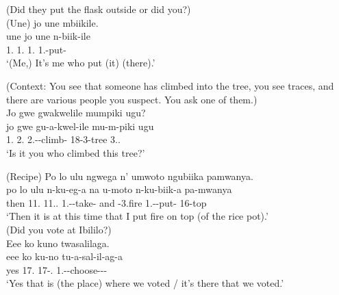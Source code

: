 \documentclass[output=paper]{langscibook}
\begin{document}
\ea
\label{bkm:Ref98085850}
(Did they put the flask outside or did you?)\\
(Une) jo une mbiikile.\\
\gll
une  jo  une  n-biik-ile\\
1\SG.\PRO{}  1.\IDCOP{}  1\SG.\PRO{}  1\SG.\SM{}-put-\PFV{}\\
\glt
‘(Me,) It’s me who put (it) (there).’\\

\z


\ea
(Context: You see that someone has climbed into the tree, you see traces, and there are various people you suspect. You ask one of them.)\\
Jo gwe gwakwelile mumpiki ugu?\\
\gll
jo  gwe  gu-a-kwel-ile  mu-m-piki  ugu\\
1.\IDCOP{}  2\SG.\PRO{}  2\SG.\SM-\PST{}-climb-\PFV{}  18-3-tree  3.\DEM.\PROX{}\\
\glt
‘Is it you who climbed this tree?’\\

\z


\ea
\label{bkm:Ref98085919}
(Recipe)
Po lo ulu ngwega n’ umwoto ngubiika pamwanya.\\
\gll
po  lo  ulu  n-ku-eg-a  na  u-moto   n-ku-biik-a  pa-mwanya \\
then  11.\IDCOP{}  11.\DEM.\PROX{}  1\SG.\SM{}-\PRS{}-take-\FV{}  and  \AUG{}-3.fire  1\SG.\SM-\PRS{}-put-\FV{}  16-top \\
\glt
‘Then it is at this time that I put fire on top (of the rice pot).'\\

\ex
(Did you vote at Ibililo?)\\
Eee ko kuno twasalilaga.\\
\gll
eee  ko  ku-no  tu-a-sal-il-ag-a\\
yes  17.\IDCOP{}  17-\DEM.\PROX{}  1\PL.\SM-\PST{}-choose-\APPL-\HAB-\FV{}\\
\glt
‘Yes that is (the place) where we voted / it’s there that we voted.’\\

\z
\end{document}
